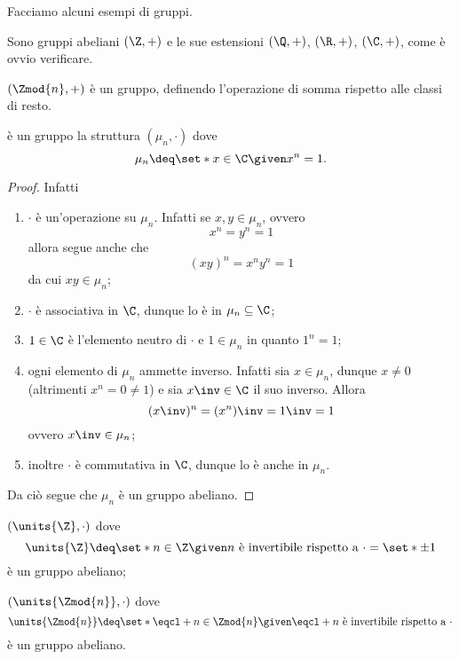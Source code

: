Facciamo alcuni esempi di gruppi.
\begin{example}
    Sono gruppi abeliani $(\Z, +)$ e le sue estensioni $(\Q, +)$, $(\R, +)$, $(\C, +)$, come è ovvio verificare.
\end{example}
\begin{example}
    $(\Zmod{n}, +)$ è un gruppo, definendo l'operazione di somma rispetto alle classi di resto.
\end{example}
\begin{example}
    è un gruppo la struttura $(\mu_n, \cdot)$ dove \[
        \mu_n \deq \set*{x \in \C \given x^n = 1}.    
    \]
\end{example}
\begin{proof}
    Infatti \begin{enumerate}[label={(G\arabic*)}, start=0]
        \item $\cdot$ è un'operazione su $\mu_n$. Infatti se $x, y \in \mu_n$, ovvero \[
            x^n = y^n = 1    
        \] allora segue anche che \[
            (xy)^n = x^ny^n = 1    
        \] da cui $xy \in \mu_n$;
        \item $\cdot$ è associativa in $\C$, dunque lo è in $\mu_n \subseteq \C$;
        \item $1 \in \C$ è l'elemento neutro di $\cdot$ e $1 \in \mu_n$ in quanto $1^n = 1$;
        \item ogni elemento di $\mu_n$ ammette inverso. Infatti sia $x \in \mu_n$, dunque $x \neq 0$ (altrimenti $x^n = 0 \neq 1$) e sia $x\inv \in \C$ il suo inverso. Allora \[
            (x\inv)^n = (x^n)\inv = 1\inv = 1    
        \] ovvero $x\inv \in \mu_n$;
        \item inoltre $\cdot$ è commutativa in $\C$, dunque lo è anche in $\mu_n$.
    \end{enumerate}
    Da ciò segue che $\mu_n$ è un gruppo abeliano.
\end{proof}
\begin{example}
    $(\units{\Z}, \cdot)$ dove \[
        \units{\Z} \deq \set*{n \in \Z \given n \text{ è invertibile rispetto a } \cdot} = \set*{\pm 1}
    \] è un gruppo abeliano;
\end{example}
\begin{example}
    $(\units{\Zmod{n}}, \cdot)$ dove \[
        \units{\Zmod{n}} \deq \set*{\eqcl+ n \in \Zmod{n} \given \eqcl+ n \text{ è invertibile rispetto a } \cdot}
    \] è un gruppo abeliano.
\end{example}
